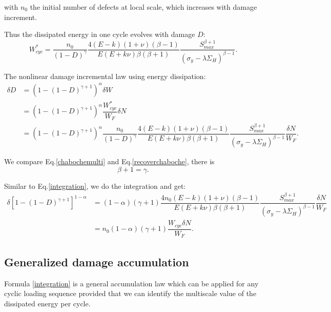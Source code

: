 \documentclass[3p,times,number,review]{elsarticle}
\begin{document}
with $n_0$ the initial number of defects at local scale, which increases with damage increment.

Thus the dissipated energy in one cycle evolves with damage $D$:
\begin{equation}
W_{cyc}^*=\dfrac{n_0}{\left(1-D \right)^\gamma}\dfrac{4(E-k)(1+\nu)\left( \beta-1\right) }{ E(E+k\nu)\beta\left( \beta+1\right) }\dfrac{S_{max}^{\beta+1}}{\left(\sigma_y-\lambda \Sigma_H\right)^{\beta-1}}.
\end{equation} 

The nonlinear damage incremental law using energy dissipation:
\begin{equation}
\begin{split}
  \delta D &=\left( 1 -(1-D)^{\gamma+1}\right)^\alpha \delta W
  \\&= \left( 1 -(1-D)^{\gamma+1}\right)^\alpha \dfrac{W_{cyc}^*}{W_F}\delta N
  \\&= \left( 1 -(1-D)^{\gamma+1}\right)^\alpha \dfrac{n_0}{\left(1-D \right)^\gamma}\dfrac{4(E-k)(1+\nu)\left( \beta-1\right) }{ E(E+k\nu)\beta\left( \beta+1\right) }\dfrac{S_{max}^{\beta+1}}{\left(\sigma_y-\lambda \Sigma_H\right)^{\beta-1}}\dfrac{\delta N}{W_F}.
\end{split}
\label{recoverchaboche}
\end{equation} 

We compare Eq.\eqref{chabochemulti} and Eq.\eqref{recoverchaboche}, there is 
$$\beta+1=\gamma. $$

Similar to Eq.\eqref{integration}, we do the integration and get:
\begin{equation}
\begin{split}
	\delta[1-(1-D)^{\gamma+1}]^{1-\alpha}&=(1-\alpha)(\gamma+1)\dfrac{4n_0(E-k)(1+\nu)\left( \beta-1\right) }{ E(E+k\nu)\beta\left( \beta+1\right)}\dfrac{S_{max}^{\beta+1}}{ \left(\sigma_y-\lambda \Sigma_H\right)^{\beta-1}}\dfrac{\delta N}{W_F}
	\\&=n_0(1-\alpha)(\gamma+1)\dfrac{W_{cyc}\delta N}{W_F}.
	\end{split}
\label{integrationW}
\end{equation}


 
\subsection{Generalized damage accumulation}
Formula \eqref{integration} is a general accumulation law which can be applied for any cyclic loading sequence provided that we can identify the multiscale value of the dissipated energy per cycle. 
\end{document}
